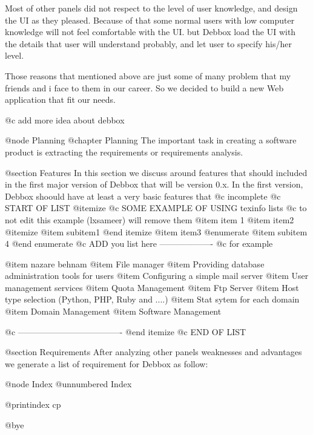 Most of other panels did not respect to the level of user knowledge, and design the UI as they pleased. Because of that
some normal users with low computer knowledge will not feel comfortable with the UI. but Debbox load the UI with the details
 that user will understand probably, and let user to specify his/her level.

Those reasons that mentioned above are just some of many problem that my friends and i face to them in our career. So
we decided to build a new Web application that fit our needs.


@c add more idea about debbox       

@node Planning
@chapter Planning
The important task in creating a software product is extracting the requirements or requirements analysis. 

@section Features
In this section we discuss around features that should included in the first major version of Debbox that will be version 0.x.
In the first version, Debbox shoould have at least a very basic features that @c incomplete
@c START OF LIST
@itemize
@c SOME EXAMPLE OF USING texinfo lists
@c to not edit this example (lxsameer) will remove them
@item
item 1
@item
item2
@itemize
@item 
subitem1
@end itemize
@item
item3
@enumerate 
@item
subitem 4
@end enumerate
@c ADD you list here -------------------
@c for example

@item
nazare behnam
@item
File manager
@item
Providing database administration tools for users
@item
Configuring a simple mail server 
@item
User management services
@item
Quota Management
@item
Ftp Server
@item
Host type selection (Python, PHP, Ruby and ....)
@item
Stat sytem for each domain
@item
Domain Management
@item
Software Management 

@c -------------------------------------
@end itemize
@c END OF LIST

@section Requirements
After analyzing other panels weaknesses and advantages we generate a list of requirement for Debbox as follow:

@node Index
@unnumbered Index

@printindex cp

@bye
